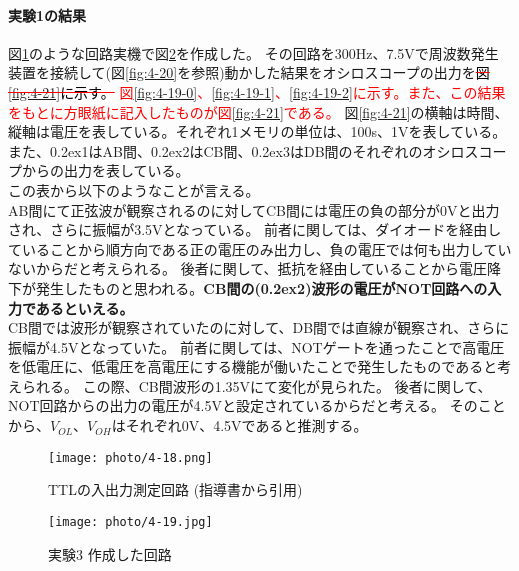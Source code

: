 \documentclass[dvipdfmx]{jsarticle}
\newcommand{\Add}[1]{\textcolor{red}{#1}}
\newcommand{\Erase}[1]{\textcolor{red}{\sout{\textcolor{black}{#1}}}}
\newcommand{\ctext}[1]{\raise0.2ex\hbox{\textcircled{\scriptsize{#1}}}}
\begin{document}
\paragraph{実験1の結果}
\label{kekka}
図\ref{fig:4-18}のような回路実機で図\ref*{fig:4-19}を作成した。
その回路を300Hz、7.5Vで周波数発生装置を接続して(図\ref*{fig:4-20}を参照)動かした結果をオシロスコープの出力を\Erase{図\ref*{fig:4-21}に示す。}
\Add{図\ref*{fig:4-19-0}、\ref*{fig:4-19-1}、\ref*{fig:4-19-2}に示す。また、この結果をもとに方眼紙に記入したものが図\ref*{fig:4-21}である。}
図\ref*{fig:4-21}の横軸は時間、縦軸は電圧を表している。それぞれ1メモリの単位は、100\textmu s、1Vを表している。
また、\ctext{1}はAB間、\ctext{2}はCB間、\ctext{3}はDB間のそれぞれのオシロスコープからの出力を表している。\\
この表から以下のようなことが言える。\\

AB間にて正弦波が観察されるのに対してCB間には電圧の負の部分が0Vと出力され、さらに振幅が3.5Vとなっている。
前者に関しては、ダイオードを経由していることから順方向である正の電圧のみ出力し、負の電圧では何も出力していないからだと考えられる。
後者に関して、抵抗を経由していることから電圧降下が発生したものと思われる。\textbf{CB間の(\ctext{2})波形の電圧がNOT回路への入力であるといえる。}\\

CB間では波形が観察されていたのに対して、DB間では直線が観察され、さらに振幅が4.5Vとなっていた。
前者に関しては、NOTゲートを通ったことで高電圧を低電圧に、低電圧を高電圧にする機能が働いたことで発生したものであると考えられる。
この際、CB間波形の1.35Vにて変化が見られた。
後者に関して、NOT回路からの出力の電圧が4.5Vと設定されているからだと考える。
そのことから、$V_{OL}$、$V_{OH}$はそれぞれ0V、4.5Vであると推測する。

\begin{figure}[hbtp]
  \begin{center}
    \texttt{[image: photo/4-18.png]}
  \end{center}
  \caption{TTLの入出力測定回路 (指導書\cite[p.3-14]{degital}から引用)}
  \label{fig:4-18}
\end{figure}

\begin{figure}[hbtp]
  \begin{center}
    \texttt{[image: photo/4-19.jpg]}
  \end{center}
  \caption{実験3 作成した回路}
  \label{fig:4-19}
\end{figure}
\end{document}
